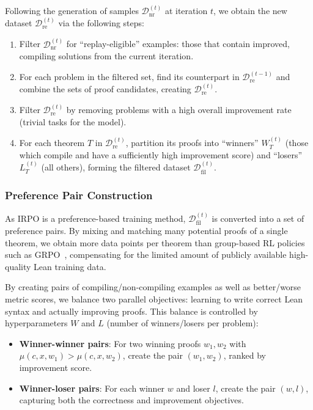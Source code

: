 Following the generation of samples $\mathcal{D}_\text{nr}^{(t)}$ at iteration $t$, we obtain the new dataset $\mathcal{D}_\text{re}^{(t)}$ via the following steps:

\begin{enumerate}
    \item Filter $\mathcal{D}_\text{nr}^{(t)}$ for ``replay-eligible'' examples: those that contain improved, compiling solutions from the current iteration.
    \item For each problem in the filtered set, find its counterpart in $\mathcal{D}_\text{re}^{(t-1)}$ and combine the sets of proof candidates, creating $\mathcal{D}_\text{re}^{(t)}$.
    \item Filter $\mathcal{D}_\text{re}^{(t)}$ by removing problems with a high overall improvement rate (trivial tasks for the model).
    \item For each theorem $T$ in $\mathcal{D}_\text{re}^{(t)}$, partition its proofs into ``winners'' $W_T^{(t)}$ (those which compile and have a sufficiently high improvement score) and ``losers'' $L_T^{(t)}$ (all others), forming the filtered dataset $\mathcal{D}_\text{fil}^{(t)}$.
\end{enumerate}

\subsubsection{Preference Pair Construction}

As IRPO is a preference-based training method, $\mathcal{D}_{\text{fil}}^{(t)}$ is converted into a set of preference pairs. By mixing and matching many potential proofs of a single theorem, we obtain more data points per theorem than group-based RL policies such as GRPO~\cite{GRPO}, compensating for the limited amount of publicly available high-quality Lean training data.

By creating pairs of compiling/non-compiling examples as well as better/worse metric scores, we balance two parallel objectives: learning to write correct Lean syntax and actually improving proofs. This balance is controlled by hyperparameters $W$ and $L$ (number of winners/losers per problem):

\begin{itemize}
    \item \textbf{Winner-winner pairs}: For two winning proofs $w_1, w_2$ with $\mu(c,x,w_1) > \mu(c,x,w_2)$, create the pair $(w_1, w_2)$, ranked by improvement score.
    \item \textbf{Winner-loser pairs}: For each winner $w$ and loser $l$, create the pair $(w, l)$, capturing both the correctness and improvement objectives.
\end{itemize}

